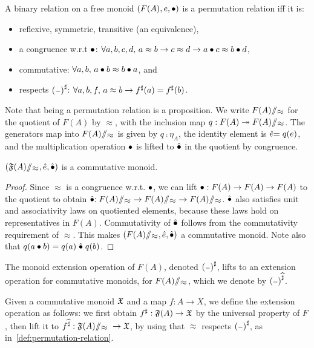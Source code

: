 \begin{definition}
    \label{def:permutation-relation}
    \leavevmode
    A binary relation on a free monoid $(F(A), e, \mathbin{\bullet})$ is a permutation relation iff it is:
    \begin{itemize}
        \item reflexive, symmetric, transitive (an equivalence),
        \item a congruence w.r.t $\mathbin{\bullet}$: $\forall a, b, c, d, \, a \approx b \to c \approx d \to a \mathbin{\bullet} c \approx b \mathbin{\bullet} d$,
        \item commutative: $\forall a, b, \, a \mathbin{\bullet} b \approx b \mathbin{\bullet} a$, and
        \item respects $\ext{(\blank)}$: $\forall a, b, f, \, a \approx b \to {f}^{\sharp}(a) = {f}^{\sharp}(b)$.
    \end{itemize}
\end{definition}
%
Note that being a permutation relation is a proposition.
We write ${{\displaystyle F(A)}}{\sslash}{_{\displaystyle \approx}}$ for the quotient of $F(A)$ by $\approx$,
with the inclusion map $q: F(A) \twoheadrightarrow {{\displaystyle F(A)}}{\sslash}{_{\displaystyle \approx}}$.
%
The generators map into ${{\displaystyle F(A)}}{\sslash}{_{\displaystyle \approx}}$ is given by $q \comp \eta_A$,
the identity element is $\mathrel{\hat{e}} = q(e)$,
and the multiplication operation $\mathbin{\bullet}$ is lifted to $\mathrel{\hat{\mathbin{\bullet}}}$ in the quotient by congruence.
%
\begin{propositionrep}
    $({{\displaystyle \mathfrak{F}(A)}}{\sslash}{_{\displaystyle \approx}}, \mathrel{\hat{e}}, \mathrel{\hat{\mathbin{\bullet}}})$ is a commutative monoid.
\end{propositionrep}
\begin{proof}
    Since $\approx$ is a congruence w.r.t. $\mathbin{\bullet}$,
    we can lift $\mathbin{\bullet} : F(A) \to F(A) \to F(A)$ to the quotient to obtain
    $\mathrel{\hat{\mathbin{\bullet}}} : {{\displaystyle F(A)}}{\sslash}{_{\displaystyle \approx}} \to {{\displaystyle F(A)}}{\sslash}{_{\displaystyle \approx}} \to {{\displaystyle F(A)}}{\sslash}{_{\displaystyle \approx}}$.
    $\mathrel{\hat{\mathbin{\bullet}}}$ also satisfies unit and associativity laws on quotiented elements,
    because these laws hold on representatives in $F(A)$.
    Commutativity of $\mathrel{\hat{\mathbin{\bullet}}}$ follows from the commutativity requirement of $\approx$.
    This makes $({{\displaystyle F(A)}}{\sslash}{_{\displaystyle \approx}}, \mathrel{\hat{e}}, \mathrel{\hat{\mathbin{\bullet}}})$ a commutative monoid.
    Note also that $q(a \mathbin{\bullet} b) = q(a) \mathrel{\hat{\mathbin{\bullet}}} q(b)$.
\end{proof}
%
The monoid extension operation of $F(A)$, denoted $\ext{(\blank)}$,
lifts to an extension operation for commutative monoids, for ${{\displaystyle F(A)}}{\sslash}{_{\displaystyle \approx}}$,
which we denote by $\exthat{(\blank)}$.
%
\begin{definition}
    Given a commutative monoid $\mathfrak{X}$ and a map $f : A \to X$,
    we define the extension operation as follows:
    we first obtain ${f}^{\sharp} : \mathfrak{F}(A) \to \mathfrak{X}$ by the universal property of $F$,
    then lift it to ${f}^{\widehat{\sharp}} : {{\displaystyle \mathfrak{F}(A)}}{\sslash}{_{\displaystyle \approx}} \; \to \mathfrak{X}$,
    by using that $\approx$ respects $\ext{(\blank)}$, as in~\cref{def:permutation-relation}.
\end{definition}

